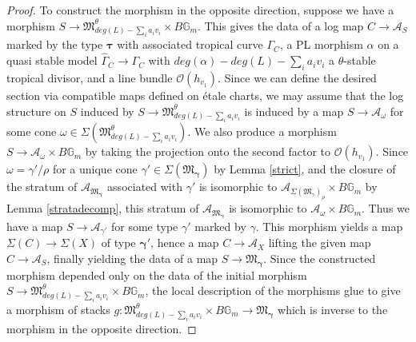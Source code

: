 \documentclass[10pt,a4paper]{amsart}
\begin{document}
\begin{proof}
To construct the morphism in the opposite direction, suppose we have a morphism $S \rightarrow \mathfrak{M}^\theta_{deg(L) -\sum_i a_iv_i} \times B\mathbb{G}_m$. This gives the data of a log map $C \rightarrow \mathcal{A}_S$ marked by the type $\pmb\tau$ with associated tropical curve $\Gamma_C$, a PL morphism $\alpha$ on a quasi stable model $\widehat{\Gamma}_C \rightarrow \Gamma_C$ with $deg(\alpha) - deg(L) -\sum_i a_iv_i$ a $\theta$-stable tropical divisor, and a line bundle $\mathcal{O}(h_{v_1})$. Since we can define the desired section via compatible maps defined on \'etale charts, we may assume that the log structure on $S$ induced by $S \rightarrow \mathfrak{M}^\theta_{deg(L) -\sum_i a_iv_i}$ is induced by a map $S \rightarrow \mathcal{A}_{\omega}$ for some cone $\omega \in \Sigma( \mathfrak{M}^\theta_{deg(L) -\sum_i a_iv_i})$. We also produce a morphism $S \rightarrow \mathcal{A}_\omega \times B\mathbb{G}_m$ by taking the projection onto the second factor to $\mathcal{O}(h_{v_1})$. Since $\omega = \gamma'/\rho$ for a unique cone $\gamma' \in \Sigma(\mathfrak{M}_{\pmb\gamma})$ by Lemma \ref{strict}, and the closure of the stratum of $\mathcal{A}_{\mathfrak{M}_{\pmb\gamma}}$ associated with $\gamma'$ is isomorphic to $\mathcal{A}_{\Sigma(\mathfrak{M}_{\gamma})_{\rho}} \times B\mathbb{G}_m$ by Lemma \ref{stratadecomp}, this stratum of $\mathcal{A}_{\mathfrak{M}_{\pmb\gamma}}$ is isomorphic to $\mathcal{A}_{\omega}\times B\mathbb{G}_m$. Thus we have a map $S \rightarrow \mathcal{A}_{\gamma'}$ for some type $\gamma'$ marked by $\gamma$. This morphism yields a map $\Sigma(C) \rightarrow \Sigma(X)$ of type $\pmb\gamma'$, hence a map $C \rightarrow \mathcal{A}_X$ lifting the given map $C \rightarrow \mathcal{A}_S$, finally yielding the data of a map $S \rightarrow \mathfrak{M}_{\pmb\gamma}$. Since the constructed morphism depended only on the data of the initial morphism $S \rightarrow \mathfrak{M}^{\theta}_{deg(L) -\sum_i a_iv_i} \times B\mathbb{G}_m$, the local description of the morphisms glue to give a morphism of stacks $g: \mathfrak{M}^\theta_{deg(L) -\sum_i a_iv_i} \times B\mathbb{G}_m \rightarrow \mathfrak{M}_{\pmb\gamma}$ which is inverse to the morphism in the opposite direction. 


\end{proof}
\end{document}
